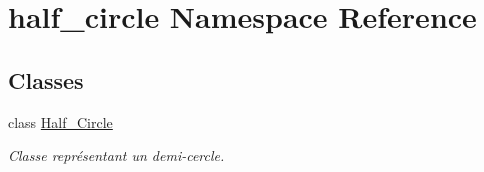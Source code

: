 \hypertarget{namespacehalf__circle}{}\section{half\+\_\+circle Namespace Reference}
\label{namespacehalf__circle}
\subsection*{Classes}
\begin{DoxyCompactItemize}
\item 
class \hyperlink{classhalf__circle_1_1_half___circle}{Half\+\_\+\+Circle}
\begin{DoxyCompactList}\small\item\em Classe représentant un demi-\/cercle. \end{DoxyCompactList}\end{DoxyCompactItemize}
